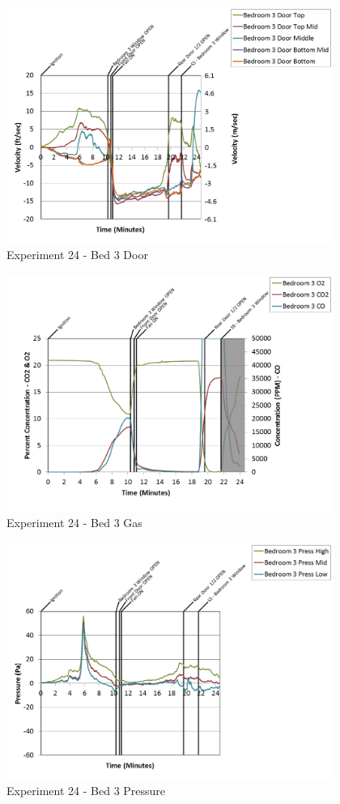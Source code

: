 \documentclass{article}
\begin{document}
\begin{appendices}
\begin{figure}[h!]
	\centering
	\includegraphics[height=3.05in]{0_Images/Results_Charts/Exp_24_Charts/Bed3Door.png}
	\caption{Experiment 24 - Bed 3 Door}
\end{figure}

\clearpage

\begin{figure}[h!]
	\centering
	\includegraphics[height=3.05in]{0_Images/Results_Charts/Exp_24_Charts/Bed3Gas.png}
	\caption{Experiment 24 - Bed 3 Gas}
\end{figure}


\begin{figure}[h!]
	\centering
	\includegraphics[height=3.05in]{0_Images/Results_Charts/Exp_24_Charts/Bed3Pressure.png}
	\caption{Experiment 24 - Bed 3 Pressure}
\end{figure}


\end{appendices}
\end{document}
